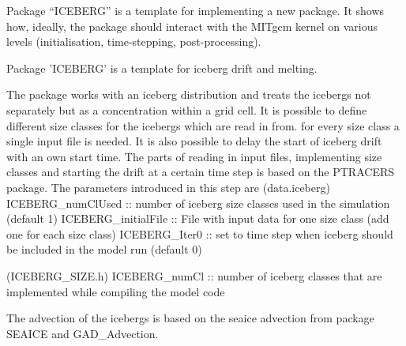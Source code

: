 
Package ``ICEBERG'' is a template for implementing a new package.
It shows how, ideally, the package should interact with the
MITgcm kernel on various levels (initialisation, time-stepping,
post-processing).

Package 'ICEBERG' is a template for iceberg drift and melting.

The package works with an iceberg distribution and treats the icebergs not separately but as a concentration
within a grid cell.
It is possible to define different size classes for the icebergs which are read in from.
for every size class a single input file is needed.
It is also possible to delay the start of iceberg drift with an own start time.
The parts of reading in input files, implementing size classes and starting the
drift at a certain time step is based on the PTRACERS package.
The parameters introduced in this step are
(data.iceberg)
ICEBERG_numClUsed  ::  number of iceberg size classes used in the simulation (default 1)
ICEBERG_initialFile  ::  File with input data for one size class (add one for each size class)
ICEBERG_Iter0  ::  set to time step when iceberg should be included in the model run (default 0)

(ICEBERG_SIZE.h)
ICEBERG_numCl  ::  number of iceberg classes that are implemented while compiling the model code



The advection of the icebergs is based on the seaice advection from package SEAICE
and GAD_Advection.

